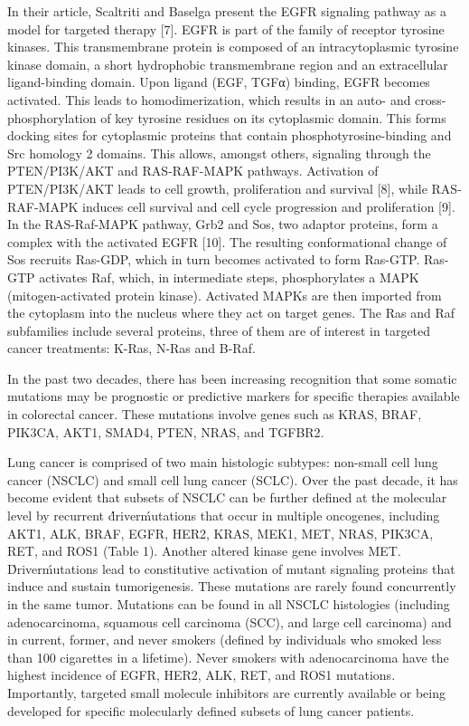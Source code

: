 In their article, Scaltriti and Baselga present the EGFR signaling pathway as a
model for targeted therapy [7]. EGFR is part of the family of receptor tyrosine
kinases. This transmembrane protein is composed of an intracytoplasmic tyrosine
kinase domain, a short hydrophobic transmembrane region and an extracellular
ligand-binding domain. Upon ligand (EGF, TGFα) binding, EGFR becomes activated.
This leads to homodimerization, which results in an auto- and
cross-phosphorylation of key tyrosine residues on its cytoplasmic domain. This
forms docking sites for cytoplasmic proteins that contain
phosphotyrosine-binding and Src homology 2 domains. This allows, amongst others,
signaling through the PTEN/PI3K/AKT and RAS-RAF-MAPK pathways. Activation of
PTEN/PI3K/AKT leads to cell growth, proliferation and survival [8], while
RAS-RAF-MAPK induces cell survival and cell cycle progression and proliferation
[9]. In the RAS-Raf-MAPK pathway, Grb2 and Sos, two adaptor proteins, form a
complex with the activated EGFR [10]. The resulting conformational change of Sos
recruits Ras-GDP, which in turn becomes activated to form Ras-GTP. Ras-GTP
activates Raf, which, in intermediate steps, phosphorylates a MAPK
(mitogen-activated protein kinase). Activated MAPKs are then imported from the
cytoplasm into the nucleus where they act on target genes. The Ras and Raf
subfamilies include several proteins, three of them are of interest in targeted
cancer treatments: K-Ras, N-Ras and B-Raf.

In the past two decades, there has been increasing recognition that some somatic
mutations may be prognostic or predictive markers for specific therapies
available in colorectal cancer. These mutations involve genes such as KR​AS,
BRAF, PIK3CA, AKT1, SMAD4, PTEN, NRAS, and TGFBR2.

Lung cancer is comprised of two main histologic subtypes: non-small cell lung
cancer (NSCLC) and small cell lung cancer (SCLC). Over the past decade, it has
become evident that subsets of NSCLC can be further defined at the molecular
level by recurrent \'driver\' mutations that occur in multiple oncogenes,
including AKT1, ALK, BRAF, EGFR, HER2, KRAS, MEK1, MET, NRAS, PIK3CA, RET, and
ROS1 (Table 1). Another altered kinase gene involves MET. \'Driver\' mutations
lead to constitutive activation of mutant signaling proteins that induce and
sustain tumorigenesis. These mutations are rarely found concurrently in the same
tumor. Mutations can be found in all NSCLC histologies (including
adenocarcinoma, squamous cell carcinoma (SCC), and large cell carcinoma) and in
current, former, and never smokers (defined by individuals who smoked less than
100 cigarettes in a lifetime). Never smokers with adenocarcinoma have the
highest incidence of EGFR, HER2, ALK, RET, and ROS1 mutations. Importantly,
targeted small molecule inhibitors are currently available or being developed
for specific molecularly defined subsets of lung cancer patients.

